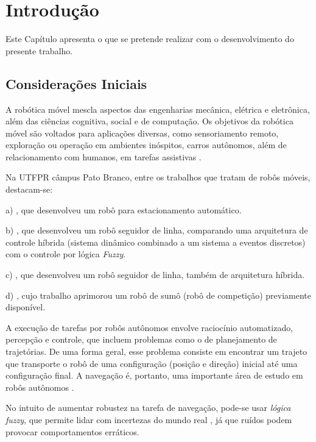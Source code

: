 \chapter{Introdução}
\vspace{-2.5 cm}

Este Capítulo apresenta o que se pretende realizar com o desenvolvimento do
presente trabalho.

\section{Considerações Iniciais} 

A robótica móvel mescla aspectos das engenharias mecânica, elétrica e
eletrônica, além das ciências cognitiva, social e de computação. Os objetivos da
robótica móvel são voltados para aplicações diversas, como sensoriamento remoto,
exploração ou operação em ambientes inóspitos, carros autônomos, além de
relacionamento com humanos, em tarefas assistivas \cite{Livro_Siegwart}.

Na UTFPR câmpus Pato Branco, entre os trabalhos que tratam de robôs móveis,
destacam-se: 

a) , que desenvolveu um robô para estacionamento
automático.

b) , que desenvolveu um robô seguidor de linha,
comparando uma arquitetura de controle híbrida (sistema dinâmico combinado a um
sistema a eventos discretos) com o controle por lógica \textit{Fuzzy}.

c) , que desenvolveu um robô seguidor de linha, também de
arquitetura híbrida.

d) , cujo trabalho aprimorou um robô de
sumô (robô de competição) previamente disponível. 

A execução de tarefas por robôs autônomos envolve raciocínio automatizado,
percepção e controle, que incluem problemas como o de planejamento de
trajetórias. De uma forma geral, esse problema consiste em encontrar um
trajeto que transporte o robô de uma configuração (posição e direção)
inicial até uma configuração final. A navegação é, portanto, uma importante área
de estudo em robôs autônomos \cite{mest_marchi, mest_neto, Tcc_Ottoni}.

No intuito de aumentar robustez na tarefa de navegação, pode-se usar
\textit{lógica fuzzy}, que permite lidar com incertezas do mundo real
\cite{inbook:FuzzyNavigationIntech}, já que ruídos podem provocar comportamentos
erráticos.

